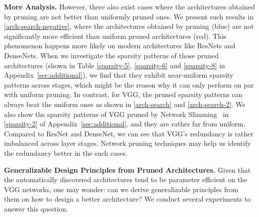 \textbf{More Analysis.} However, there also exist cases where the architectures obtained by pruning are not better than uniformly pruned ones.
We present such results in 
\autoref{arch-search-negative}, where the architectures obtained by pruning (blue) are not significantly more efficient than uniform pruned architectures (red). This phenomenon happens more likely on modern architectures like ResNets and DenseNets. When we investigate the sparsity patterns of those pruned architectures (shown in Table \ref{sparsity-5}, \ref{sparsity-6} and \ref{sparsity-8} in  Appendix~\ref{sec:additional}), we find that they exhibit near-uniform sparsity patterns across stages, which might be the reason why it can only perform on par with uniform pruning. In contrast, for VGG, the pruned sparsity patterns can always beat the uniform ones as shown in \autoref{arch-search} and \autoref{arch-search-2}. We also show the sparsity patterns of VGG pruned by Network Slimming~\citep{liu2017learning} in \autoref{sparsity-2} of Appendix~\ref{sec:additional}, and they are rather far from uniform. Compared to ResNet and DenseNet, we can see that VGG's redundancy is rather imbalanced across layer stages. Network pruning techniques may help us identify the redundancy better in the such cases.

\vspace{1.5ex}
\textbf{Generalizable Design Principles from Pruned Architectures.} Given that the automatically discovered architectures tend to be parameter efficient on the VGG networks, one may wonder: can we derive generalizable principles from them on how to design a better architecture? We conduct several experiments to answer this question.


